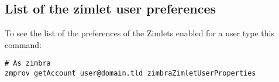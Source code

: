     \subsection{List of the zimlet user preferences}
    \label{sect:gatheringinfo-userzimlets-pref}
        To see the list of the preferences of the Zimlets enabled for a user type this command:
        \begin{verbatim}
# As zimbra
zmprov getAccount user@domain.tld zimbraZimletUserProperties
        \end{verbatim}

